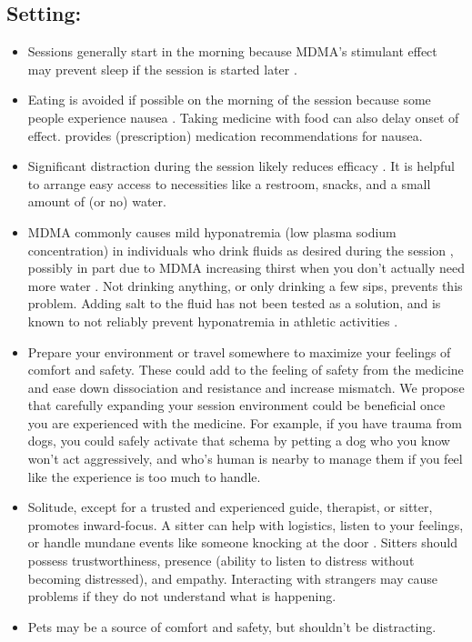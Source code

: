 \documentclass[12pt,letterpaper]{book}
\begin{document}
\subsection*{Setting:}
\begin{itemize}
    \item Sessions generally start in the morning because MDMA's stimulant effect may prevent sleep if the session is started later \cite{berro2018acute}.
    \item Eating is avoided if possible on the morning of the session because some people experience nausea \cite{colcott2024side}. Taking medicine with food can also delay onset of effect. \textcite{liechtiInteractions} provides (prescription) medication recommendations for nausea.
    \item Significant distraction during the session likely reduces efficacy \cite{roseman2024interrupting}. It is helpful to arrange easy access to necessities like a restroom, snacks, and a small amount of (or no) water.
    \item MDMA commonly causes mild hyponatremia (low plasma sodium concentration) in individuals who drink fluids as desired during the session \cite{atilaHyponatremia,baggottWater}, possibly in part due to MDMA increasing thirst when you don't actually need more water \cite{liechtiGender}. Not drinking anything, or only drinking a few sips, prevents this problem. Adding salt to the fluid has not been tested as a solution, and is known to not reliably prevent hyponatremia in athletic activities \cite{hew2008statement}.
    \label{contextexpansion}
    \item Prepare your environment or travel somewhere to maximize your feelings of comfort and safety. These could add to the feeling of safety from the medicine and ease down dissociation and resistance and increase mismatch. We propose that carefully expanding your session environment could be beneficial once you are experienced with the medicine. For example, if you have trauma from dogs, you could safely activate that schema by petting a dog who you know won't act aggressively, and who's human is nearby to manage them if you feel like the experience is too much to handle.
    \label{def:sitter}
    \item Solitude, except for a trusted and experienced guide, therapist, or sitter, promotes inward-focus. A sitter can help with logistics, listen to your feelings, or handle mundane events like someone knocking at the door \cite{thalSitter}. Sitters should possess trustworthiness, presence (ability to listen to distress without becoming distressed), and empathy. Interacting with strangers may cause problems if they do not understand what is happening. 
    \item Pets may be a source of comfort and safety, but shouldn't be distracting.
\end{itemize}
\end{document}
